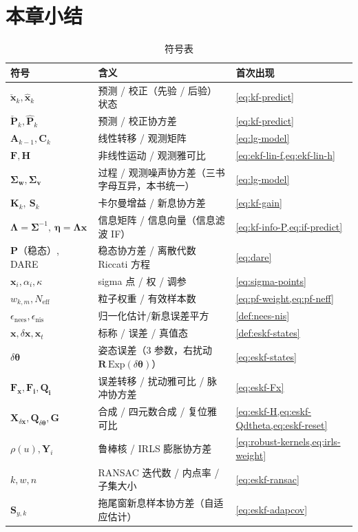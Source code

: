 \section*{本章小结}

\begin{table}[H]\centering\small
\caption{符号表}
\begin{tabular}{lll}
\toprule
符号 & 含义 & 首次出现 \\
\midrule
$\check{\mathbf{x}}_k,\hat{\mathbf{x}}_k$ & 预测 / 校正（先验 / 后验）状态 & \cref{eq:kf-predict} \\
$\check{\mathbf{P}}_k,\hat{\mathbf{P}}_k$ & 预测 / 校正协方差 & \cref{eq:kf-predict} \\
$\mathbf{A}_{k-1},\mathbf{C}_k$ & 线性转移 / 观测矩阵 & \cref{eq:lg-model} \\
$\mathbf{F},\mathbf{H}$ & 非线性运动 / 观测雅可比 & \cref{eq:ekf-lin-f,eq:ekf-lin-h} \\
$\boldsymbol{\Sigma}_{\mathbf{w}},\boldsymbol{\Sigma}_{\mathbf{v}}$ & 过程 / 观测噪声协方差（三书字母互异，本书统一） & \cref{eq:lg-model} \\
$\mathbf{K}_k,\ \mathbf{S}_k$ & 卡尔曼增益 / 新息协方差 & \cref{eq:kf-gain} \\
$\boldsymbol{\Lambda}=\boldsymbol{\Sigma}^{-1},\ \boldsymbol{\eta}=\boldsymbol{\Lambda}\mathbf{x}$ & 信息矩阵 / 信息向量（信息滤波 IF） & \cref{eq:kf-info-P,eq:if-predict} \\
$\mathbf{P}$（稳态）, DARE & 稳态协方差 / 离散代数 Riccati 方程 & \cref{eq:dare} \\
$\mathbf{x}_i,\alpha_i,\kappa$ & sigma 点 / 权 / 调参 & \cref{eq:sigma-points} \\
$w_{k,m},N_{\text{eff}}$ & 粒子权重 / 有效样本数 & \cref{eq:pf-weight,eq:pf-neff} \\
$\epsilon_{\text{nees}},\epsilon_{\text{nis}}$ & 归一化估计/新息误差平方 & \cref{def:nees-nis} \\
$\mathbf{x},\delta\mathbf{x},\mathbf{x}_t$ & 标称 / 误差 / 真值态 & \cref{def:eskf-states} \\
$\delta\boldsymbol{\theta}$ & 姿态误差（$3$ 参数，右扰动 $\mathbf{R}\,\mathrm{Exp}(\delta\boldsymbol{\theta})$） & \cref{eq:eskf-states} \\
$\mathbf{F}_{\mathbf{x}},\mathbf{F}_{\mathbf{i}},\mathbf{Q}_{\mathbf{i}}$ & 误差转移 / 扰动雅可比 / 脉冲协方差 & \cref{eq:eskf-Fx} \\
$\mathbf{X}_{\delta\mathbf{x}},\mathbf{Q}_{\delta\boldsymbol{\theta}},\mathbf{G}$ & 合成 / 四元数合成 / 复位雅可比 & \cref{eq:eskf-H,eq:eskf-Qdtheta,eq:eskf-reset} \\
$\rho(u),\mathbf{Y}_i$ & 鲁棒核 / IRLS 膨胀协方差 & \cref{eq:robust-kernels,eq:irls-weight} \\
$k,w,n$ & RANSAC 迭代数 / 内点率 / 子集大小 & \cref{eq:eskf-ransac} \\
$\mathbf{S}_{y,k}$ & 拖尾窗新息样本协方差（自适应估计） & \cref{eq:eskf-adapcov} \\
\bottomrule
\end{tabular}
\end{table}

